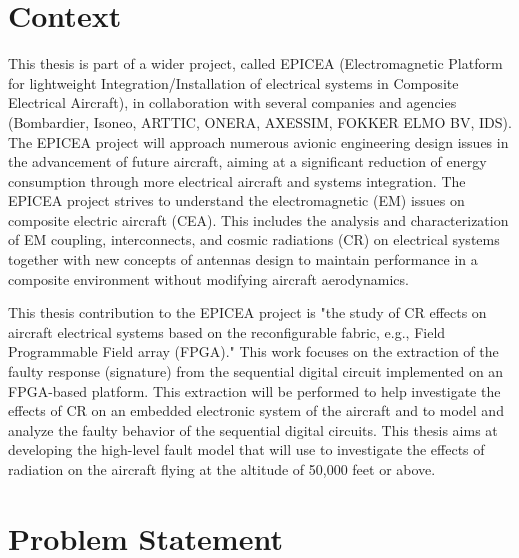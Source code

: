 

\section{Context}
\label{introduction}

This thesis is part of a wider project, called EPICEA (Electromagnetic Platform for lightweight 
Integration/Installation of electrical systems in Composite Electrical Aircraft), in collaboration with several 
companies and agencies (Bombardier, Isoneo, ARTTIC, ONERA, AXESSIM, FOKKER ELMO BV, IDS). The EPICEA project will approach
numerous avionic engineering design issues in the advancement of future aircraft, aiming at a significant
reduction of energy consumption through more electrical aircraft and systems integration. The EPICEA project strives to understand the electromagnetic (EM) issues on composite electric aircraft (CEA). This includes the analysis
and characterization of EM coupling, interconnects, and cosmic radiations (CR) on electrical systems together
with new concepts of antennas design to maintain performance in a composite environment without modifying
aircraft aerodynamics.

This thesis contribution to the EPICEA project is "the study of CR effects on aircraft electrical systems based on the reconfigurable fabric, e.g., Field Programmable Field array (FPGA)." This work focuses on the extraction of the faulty response (signature) from the sequential digital circuit implemented on an FPGA-based platform. This extraction will be performed to help investigate the effects of CR on an embedded electronic system of the aircraft and to model and analyze the faulty behavior of the sequential digital circuits. This thesis aims at developing the high-level fault model that will use to investigate the effects of radiation on the aircraft flying at the altitude of 50,000 feet or above. 

\section{Problem Statement}

